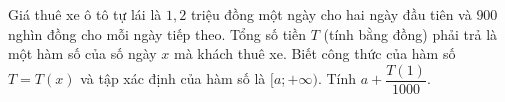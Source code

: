 \begin{ex}
Giá thuê xe ô tô tự lái là $1{,}2$ triệu đồng một ngày cho hai ngày đầu tiên và $900$ nghìn đồng cho mỗi ngày tiếp theo. Tổng số tiền $T$ (tính bằng đồng) phải trả là một hàm số của số ngày $x$ mà khách thuê xe. Biết công thức của hàm số $T=T(x)$ và tập xác định của hàm số là $[a;+\infty)$. Tính $a+\dfrac{T(1)}{1000}$.
\end{ex}
